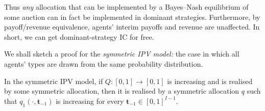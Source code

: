Thus \emph{any} allocation that can be implemented by a Bayes--Nash equilibrium of some auction
can in fact be implemented in dominant strategies.
Furthermore, by payoff/revenue equivalence, agents' interim payoffs and revenue are unaffected.
In short, we can get dominant-strategy IC for free.


We shall sketch a proof for the \emph{symmetric IPV model:}
the case in which all agents' types are drawn from the same probability distribution.

\begin{corollary}
	\label{corollary:manellivincent}
	In the symmetric IPV model,
	if $Q : [0,1] \to [0,1]$ is increasing and is realised by some symmetric allocation,
	then it is realised by a symmetric allocation $q$ such that $q_1(\cdot,\boldsymbol{t}_{-1})$ is increasing for every $\boldsymbol{t}_{-1} \in [0,1]^{I-1}$.
\end{corollary}


